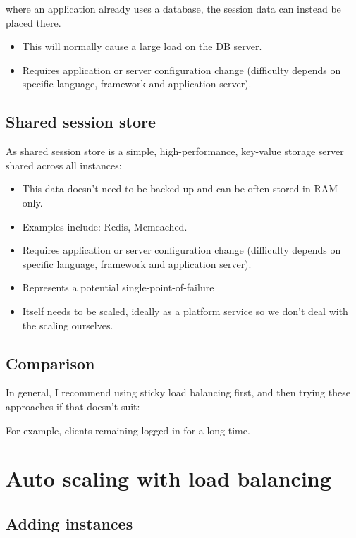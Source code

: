 \documentclass[slides]{pgnotes}
\begin{document}
where an application already uses a database, the session data can instead be placed there.
\begin{itemize}
\item This will normally cause a large load on the DB server.
\item Requires application or server configuration change (difficulty depends on specific language, framework and application server).
\end{itemize}


\subsection{Shared session store}

As shared session store is a simple, high-performance, key-value storage server shared across all instances:
\begin{itemize}
\item This data doesn't need to be backed up and can be often stored in RAM only.
\item Examples include: Redis, Memcached.
\item Requires application or server configuration change (difficulty depends on specific language, framework and application server).
\item Represents a potential single-point-of-failure
\item Itself needs to be scaled, ideally as a platform service so we don't deal with the scaling ourselves.
\end{itemize}


\subsection{Comparison}

In general, I recommend using sticky load balancing first, and then trying these approaches if that doesn't suit:

For example, clients remaining logged in for a long time.


\section{Auto scaling with load balancing}

\subsection{Adding instances}
\end{document}
